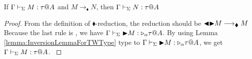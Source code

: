 
\begin{lemma}
    \label{lemma:PreservationOnBlackReduction}
    If $\G\V M:\tau@A$ and $M\longrightarrow_\blacklozenge N$, then $\G\V N:\tau@A$\\
\end{lemma}

\begin{proof}
    {
        \newcommand{\R}{\longrightarrow_{\blacklozenge}}
        From the definition of \( \blacklozenge \)-reduction, the reduction
        should be $\TBL\TB M \R M$ Because the last rule is \TTBL, we have $\Gamma
        \vdash_\Sigma {\mathop{\blacktriangleright}} M : {\mathop{\triangleright}}_\alpha \tau @A$.  By using Lemma
        \ref{lemma:InversionLemmaForTWType} type to $\Gamma \vdash_\Sigma {\mathop{\blacktriangleright}} M : {\mathop{\triangleright}}_\alpha
        \tau @A$, we get $\Gamma \vdash_\Sigma M : \tau @A$.
    }
\end{proof}

